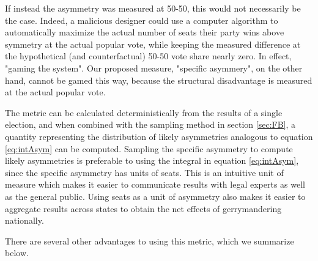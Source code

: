 \documentclass[preprint,12pt]{article}
\begin{document}
If instead the asymmetry was measured at 50-50, this would not necessarily be the case.  
Indeed, a malicious designer could use a computer algorithm to automatically maximize the actual number of seats their party wins above symmetry at the actual popular vote, while keeping the measured difference at the hypothetical (and counterfactual) 50-50 vote share nearly zero.  
In effect, "gaming the system".
Our proposed measure, "specific asymmery", on the other hand, cannot be gamed this way, because the structural disadvantage is measured at the actual popular vote.

The metric can be calculated deterministically from the results of a single election, and when combined with the sampling method in section \ref{sec:FB}, a quantity representing the distribution of likely asymmetries analogous to equation \ref{eq:intAsym} can be computed.
Sampling the specific asymmetry to compute likely asymmetries is preferable to using the integral in equation \ref{eq:intAsym}, since the specific asymmetry has units of seats.
This is an intuitive unit of measure which makes it easier to communicate results with legal experts as well as the general public.
Using seats as a unit of asymmetry also makes it easier to aggregate results across states to obtain the net effects of gerrymandering nationally.

There are several other advantages to using this metric, which we summarize below.
\end{document}
